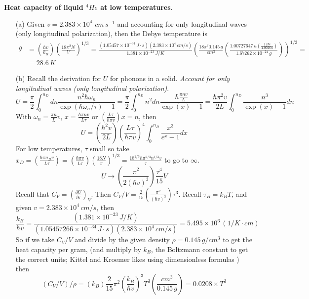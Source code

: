 \documentclass[twoside]{amsart}
\theoremstyle{plain}
\theoremstyle{definition}
\newcommand{\solutionhead}[1]
  {
   \noindent{\small\bf Solution #1.}
   }
\begin{document}
\solutionhead{14}  \textbf{Heat capacity of liquid $^4He$ at low temperatures}.  \begin{itemize}
\item[(a)] Given $v = 2.383 \times 10^4$ $cm \, s^{-1}$ and accounting for only longitudinal waves (only longitudinal polarization), then the Debye temperature is 
\[
\begin{aligned}
\theta & = \left( \frac{ \hbar v }{k_B } \right) \left( \frac{ 18 \pi^2 N }{V} \right)^{1/3} = \frac{ (1.05457 \times 10^{-34} \, J\cdot s )(2.383 \times 10^4 \, cm/s) }{ 1.381 \times 10^{-23} \, J/K} \left( \frac{ 18 \pi^2 0.145 \, g }{cm^3 } \left( \frac{ 1.00727647 \, u \left( \frac{ 1 \, He }{ 4.0026 u } \right) }{ 1.67262 \times 10^{-24 } \, g } \right) \right)^{1/3} = \\
& = \boxed{ 28.6 \, K }
\end{aligned}
\]
\item[(b)] Recall the derivation for $U$ for phonons in a solid.  \emph{Account for only longitudinal waves (only longitudinal polarization)}.  
\[
U = \frac{\pi}{2} \int_0^{n_D} dn \frac{ n^2 \hbar \omega_n }{ \exp{ (\hbar \omega_n /\tau) } - 1 } = \frac{\pi}{2} \int_0^{n_D} n^2 dn \frac{ \hbar \frac{ \pi n v }{L} }{ \exp{ (x)} - 1 } = \frac{ \hbar \pi^2 v}{2L} \int_0^{n_D} \frac{ n^3 }{\exp{ (x) } - 1 } dn
\]
With $\omega_n = \frac{\pi n }{L} v$, $x = \frac{ \hbar \pi n v}{L \tau} $ or $\left( \frac{ L \tau}{\hbar \pi v} \right) x = n$, then 
\[
U  = \left( \frac{ \hbar^2 v}{ 2L } \right) \left( \frac{ L \tau }{ \hbar \pi v} \right)^4 \int_0^{n_D} \frac{x^3}{e^x - 1 } dx 
\]
For low temperatures, $\tau$ small so take $x_D = \left( \frac{ \hbar \pi n_D v}{ L \tau} \right) = \left( \frac{\hbar \pi v}{ L \tau} \right) \left( \frac{18 N}{\pi} \right)^{1/3} = \frac{ 18^{1/3} \hbar \pi^{2/3} n^{1/3} v }{ \tau}$ to go to $\infty$.  
\[
U \to \left( \frac{ \pi^2 }{ 2 (\hbar v )^3} \right) \frac{ \tau^4 }{15} V
\]
Recall that $C_V = \left( \frac{ \partial U}{\partial \tau} \right)_{V}$.  Then $C_V/V = \frac{2}{15} \left( \frac{ \pi^2 }{ (\hbar v)^3 } \right) \tau^3 $.  Recall $\tau_B = k_B T$, and given $v= 2.383 \times 10^4 \, cm/s$, then
\[
\frac{ k_B }{ \hbar v} = \frac{ (1.381 \times 10^{-23} \, J/K )}{ (1.05457266 \times 10^{-34} \, J\cdot s )( 2.383 \times 10^{4} \, cm/s ) } = 5.495 \times 10^6 \, (1/K\cdot cm )
\]
So if we take $C_V/V$ and divide by the given density $\rho = 0.145 \, g/cm^3$ to get the heat capacity per gram, (and multiply by $k_B$, the Boltzmann constant to get the correct units; Kittel and Kroemer likes using dimensionless formulas ) then
\[
(C_V/V)/\rho = (k_B) \frac{2}{15} \pi^2 \left( \frac{k_B}{ \hbar v} \right)^3 T^3 \left( \frac{cm^3}{0.145 \, g } \right) = \boxed{ 0.0208 \times T^3 }
\]
\end{itemize}
\end{document}
